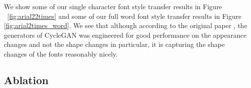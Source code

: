 \documentclass[10pt,twocolumn,letterpaper]{article}
\begin{document}
We show some of our single character font style transfer results in Figure \
\ref{fig:arial22times} and some of our full word font style transfer results in
Figure \ref{fig:arial2times_word}. We see that although according to the original paper 
\cite{cyclegan}, the generators of CycleGAN was engineered for good performance on the appearance changes and not the shape changes in particular, it is capturing the shape changes of the fonts reasonably nicely. 

\subsection{Ablation}


{\small


}
\end{document}
